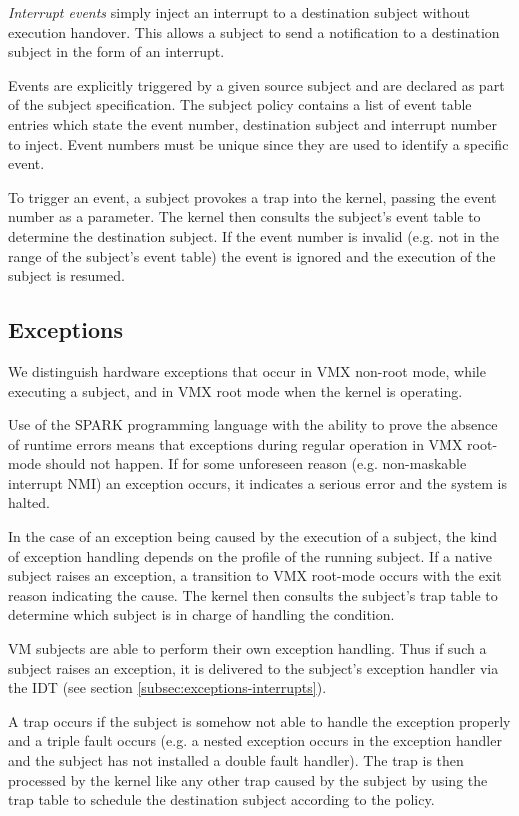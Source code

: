 \emph{Interrupt events} simply inject an interrupt to a destination subject
without execution handover. This allows a subject to send a notification to a
destination subject in the form of an interrupt.

Events are explicitly triggered by a given source subject and are declared as
part of the subject specification. The subject policy contains a list of event
table entries which state the event number, destination subject and interrupt
number to inject. Event numbers must be unique since they are used to identify a
specific event.

To trigger an event, a subject provokes a trap into the kernel, passing the
event number as a parameter. The kernel then consults the subject's event table
to determine the destination subject. If the event number is invalid (e.g. not
in the range of the subject's event table) the event is ignored and the
execution of the subject is resumed.

\subsection{Exceptions}\label{subsec:design-exceptions}
We distinguish hardware exceptions that occur in VMX non-root mode, while
executing a subject, and in VMX root mode when the kernel is operating.

Use of the SPARK programming language with the ability to prove the absence of
runtime errors means that exceptions during regular operation in VMX root-mode
should not happen. If for some unforeseen reason (e.g. non-maskable
interrupt NMI) an exception occurs, it indicates a serious error and the system
is halted.

In the case of an exception being caused by the execution of a subject, the kind
of exception handling depends on the profile of the running subject. If a native
subject raises an exception, a transition to VMX root-mode occurs with the exit
reason indicating the cause. The kernel then consults the subject's trap table
to determine which subject is in charge of handling the condition.

VM subjects are able to perform their own exception handling. Thus if such a
subject raises an exception, it is delivered to the subject's exception handler
via the IDT (see section \ref{subsec:exceptions-interrupts}).

A trap occurs if the subject is somehow not able to handle the exception
properly and a triple fault occurs (e.g. a nested exception occurs in the
exception handler and the subject has not installed a double fault handler).
The trap is then processed by the kernel like any other trap caused by the
subject by using the trap table to schedule the destination subject according to
the policy.

